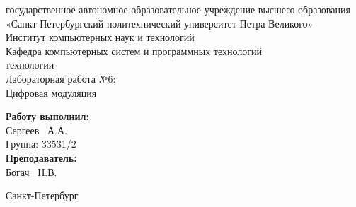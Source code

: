 \documentclass[a4paper]{article}
\begin{document}

\begin{titlepage}	%

	\begin{center}		%

		 государственное автономное образовательное учреждение высшего образования «Санкт-Петербургский политехнический университет Петра Великого» \\
		\large Институт компьютерных наук и технологий \\
		\large Кафедра компьютерных систем и программных технологий\\[2cm]
		
	    \vfill
		 технологии\\[0.5cm] %
		\large Лабораторная работа №6:\\
		Цифровая модуляция\\[4.8cm]

	\end{center}

	\begin{flushright} %
		\begin{minipage}{0.25\textwidth} %
			\begin{flushleft} %

				\large\textbf{Работу выполнил:}\\
				\large Сергеев ~А.А.\\
				\large {Группа:} 33531/2\\
				
				\large \textbf{Преподаватель:}\\
				\large Богач ~Н.В.\\

			\end{flushleft}
		\end{minipage}
	\end{flushright}
	
	\vfill %

	\begin{center}
	\large Санкт-Петербург\\
	\large \the\year %
	\end{center} %

\thispagestyle{empty} %
\end{titlepage} %
\vfill %
\tableofcontents
\newpage
\end{document}
